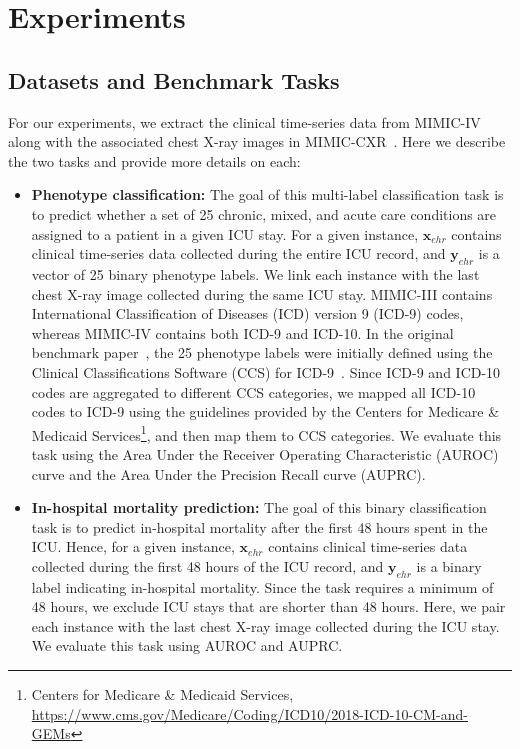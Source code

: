 \documentclass[pmlr]{jmlr}
\begin{document}
\vspace{-0.5mm}
\section{Experiments}
\label{sec:exp}
\subsection{Datasets and Benchmark Tasks} For our experiments, we extract the clinical time-series data from MIMIC-IV~\citep{mimic4} along with the associated chest X-ray images in MIMIC-CXR~\citep{mimiccxrjpg}. 
Here we describe the two tasks and provide more details on each:
\vspace{-0.5mm}
\begin{itemize}\setlength\itemsep{-0.5em}
    \item \textbf{Phenotype classification:} The goal of this multi-label classification task is to predict whether a set of 25 chronic, mixed, and acute care conditions are assigned to a patient in a given ICU stay. For a given instance, $\mathbf{x}_{ehr}$ contains clinical time-series data collected during the entire ICU record, and $\mathbf{y}_{ehr}$ is a vector of 25 binary phenotype labels. We link each instance with the last chest X-ray image collected during the same ICU stay. MIMIC-III contains International Classification of Diseases (ICD) version 9 (ICD-9) codes, whereas MIMIC-IV contains both ICD-9 and ICD-10. In the original benchmark paper~\citep{benchhmark}, the 25 phenotype labels were initially defined using the Clinical Classifications Software (CCS) for ICD-9~\citep{ccs_9}. Since ICD-9 and ICD-10 codes are aggregated to different CCS categories, we mapped all ICD-10 codes to ICD-9 using the guidelines provided by the Centers for Medicare \& Medicaid Services\footnote{Centers for Medicare \& Medicaid Services, \url{https://www.cms.gov/Medicare/Coding/ICD10/2018-ICD-10-CM-and-GEMs}}, and then map them to CCS categories. We evaluate this task using the Area Under the Receiver Operating Characteristic (AUROC) curve and the Area Under the Precision Recall curve (AUPRC).
     \item \textbf{In-hospital mortality prediction:} The goal of this binary classification task is to predict in-hospital mortality after the first 48 hours spent in the ICU. Hence, for a given instance, $\mathbf{x}_{ehr}$ contains clinical time-series data collected during the first 48 hours of the ICU record, and $\mathbf{y}_{ehr}$ is a binary label indicating in-hospital mortality. Since the task requires a minimum of 48 hours, we exclude ICU stays that are shorter than 48 hours. Here, we pair each instance with the last chest X-ray image collected during the ICU stay. We evaluate this task using AUROC and AUPRC.
\end{itemize}
\end{document}
